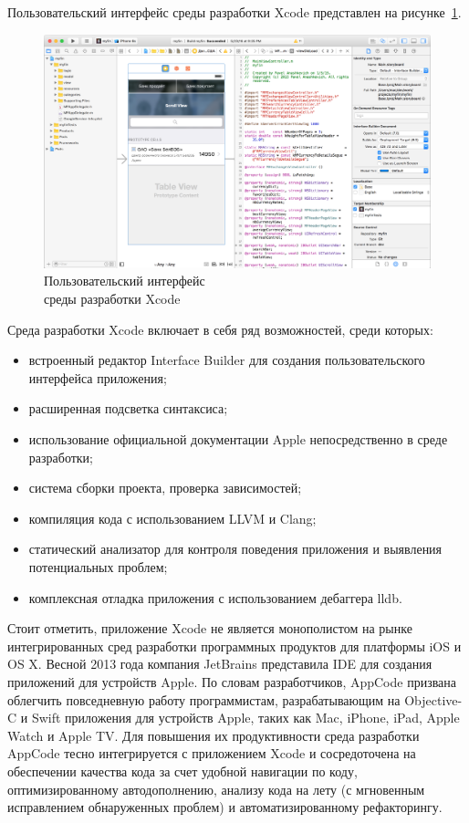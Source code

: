 Пользовательский интерфейс среды разработки Xcode представлен
на рисунке~\ref{fig:xcode}.
\begin{figure}[h!]
  \centering
  \includegraphics[width=150mm]{fig/xcode}
  \caption{Пользовательский интерфейс \\ среды разработки Xcode}
  \label{fig:xcode}
\end{figure}

Среда разработки Xcode включает в себя ряд возможностей, среди которых:
\begin{itemize}
  \item встроенный редактор Interface Builder для создания пользовательского
    интерфейса приложения;
  \item расширенная подсветка синтаксиса;
  \item использование официальной документации Apple непосредственно в среде разработки;
  \item система сборки проекта, проверка зависимостей;
  \item компиляция кода с использованием LLVM и Clang;
  \item статический анализатор для контроля поведения приложения и выявления
    потенциальных проблем;
  \item комплексная отладка приложения с использованием дебаггера lldb.
\end{itemize}

Стоит отметить, приложение Xcode не является монополистом на рынке
интегрированных сред разработки программных продуктов для платформы iOS и OS X.
Весной 2013 года компания JetBrains представила IDE для создания приложений для
устройств Apple. По словам разработчиков, AppCode призвана облегчить
повседневную работу программистам, разрабатывающим на Objective-C и Swift
приложения для устройств Apple, таких как Mac, iPhone, iPad, Apple Watch и Apple TV.
Для повышения их продуктивности среда разработки AppCode тесно интегрируется с приложением
Xcode и сосредоточена на обеспечении качества кода за счет удобной
навигации по коду, оптимизированному автодополнению, анализу кода
на лету (с мгновенным исправлением обнаруженных проблем)
и автоматизированному рефакторингу.

